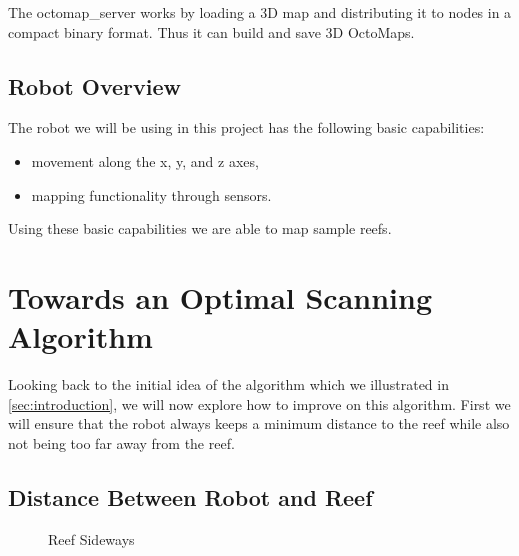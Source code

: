 \documentclass[twoside, 12pt]{article}
\begin{document}
The octomap\_server works by loading a 3D map and distributing it to nodes in a compact binary format. Thus it can build and save 3D OctoMaps.\\

\subsection{Robot Overview}

The robot we will be using in this project has the following basic capabilities:
\begin{itemize}
\item movement along the x, y, and z axes,
\item mapping functionality through sensors. 
\end{itemize}

Using these basic capabilities we are able to map sample reefs.

\newpage
\section{Towards an Optimal Scanning Algorithm}
\label{sec:optimalScanningAlgorithm}

Looking back to the initial idea of the algorithm which we illustrated in \autoref{sec:introduction}, we will now explore how to improve on this algorithm. First we will ensure that the robot always keeps a minimum distance to the reef while also not being too far away from the reef.\\

\subsection{Distance Between Robot and Reef}
\label{sec:distanceBetweenRobotAndReef}
\begin{figure}
\vspace{-28pt}
  \begin{center}
  \end{center}
\vspace{-20pt}
  \caption{Reef Sideways}
  \label{fig:reef}
\vspace{20pt}
\end{figure}
\end{document}

